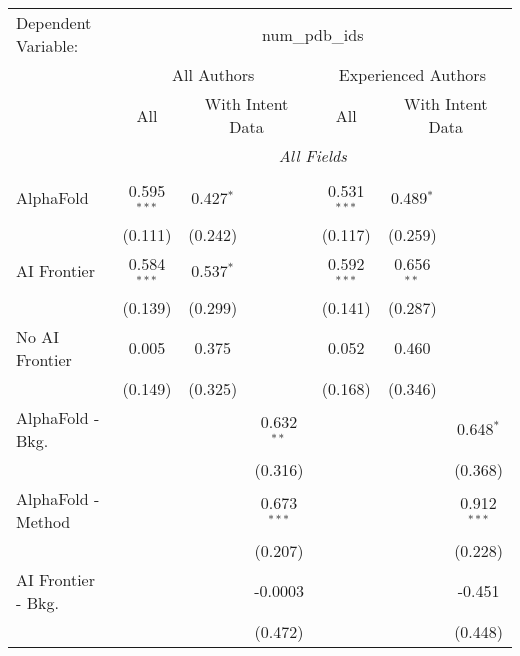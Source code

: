 \begingroup
\centering
\begin{tabular}{lcccccc}
   \tabularnewline \midrule \midrule
   Dependent Variable: & \multicolumn{6}{c}{num\_pdb\_ids}\\
 & \multicolumn{3}{c}{All Authors} & \multicolumn{3}{c}{Experienced Authors} \\
\cmidrule(lr){2-4} \cmidrule(lr){5-7}
 & \multicolumn{1}{c}{All} & \multicolumn{2}{c}{With Intent Data} & \multicolumn{1}{c}{All} & \multicolumn{2}{c}{With Intent Data} \\
\cmidrule(lr){2-2} \cmidrule(lr){3-4} \cmidrule(lr){5-5} \cmidrule(lr){6-7}
 & \multicolumn{6}{c}{\textit{All Fields}} \\ \\
   AlphaFold               & 0.595$^{***}$ & 0.427$^{*}$ &               & 0.531$^{***}$ & 0.489$^{*}$  &   \\   
                           & (0.111)       & (0.242)     &               & (0.117)       & (0.259)      &   \\   
   AI Frontier             & 0.584$^{***}$ & 0.537$^{*}$ &               & 0.592$^{***}$ & 0.656$^{**}$ &   \\   
                           & (0.139)       & (0.299)     &               & (0.141)       & (0.287)      &   \\   
   No AI Frontier          & 0.005         & 0.375       &               & 0.052         & 0.460        &   \\   
                           & (0.149)       & (0.325)     &               & (0.168)       & (0.346)      &   \\   
   AlphaFold - Bkg.        &               &             & 0.632$^{**}$  &               &              & 0.648$^{*}$\\   
                           &               &             & (0.316)       &               &              & (0.368)\\   
   AlphaFold - Method      &               &             & 0.673$^{***}$ &               &              & 0.912$^{***}$\\   
                           &               &             & (0.207)       &               &              & (0.228)\\   
   AI Frontier - Bkg.      &               &             & -0.0003       &               &              & -0.451\\   
                           &               &             & (0.472)       &               &              & (0.448)\\   

\end{tabular}
